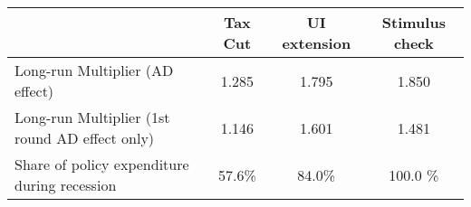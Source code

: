 \begin{tabular}{@{}lccc@{}} 
\toprule 
& Tax Cut    & UI extension    & Stimulus check    \\  \midrule 
Long-run Multiplier (AD effect) &1.285  & 1.795  & 1.850     \\ 
Long-run Multiplier (1st round AD effect only) &1.146  & 1.601  & 1.481     \\ 
Share of policy expenditure during recession &57.6\%  & 84.0\%  & 100.0 \%    \\ 
\end{tabular}  
